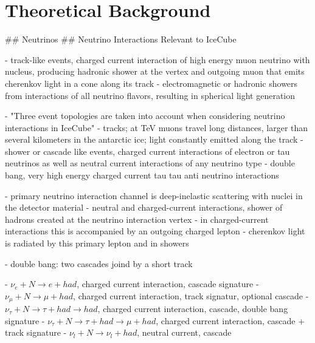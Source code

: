 
\section{Theoretical Background}
\label{sec:theoretical_background}

## Neutrinos
## Neutrino Interactions Relevant to IceCube

- track-like events, charged current interaction of high energy muon neutrino with nucleus, producing hadronic shower at the vertex and outgoing muon that emits cherenkov light in a cone along its track \cite{instrumentation}
- electromagnetic or hadronic showers from interactions of all neutrino flavors, resulting in spherical light generation \cite{instrumentation}

- "Three event topologies are taken into account when considering neutrino interactions in IceCube" \cite{skysearch}
  - tracks; at TeV muons travel long distances, larger than several kilometers in the antarctic ice; light constantly emitted along the track \cite{skysearch,mmc}
  - shower or cascade like events, charged current interactions of electron or tau neutrinos as well as neutral current interactions of any neutrino type \cite{skysearch}
  - double bang, very high energy charged current tau tau anti neutrino interactions \cite{skysearch}

- primary neutrino interaction channel is deep-inelastic scattering with nuclei in the detector material \cite{energyreco}
- neutral and charged-current interactions, shower of hadrons created at the neutrino interaction vertex \cite{energyreco}
- in charged-current interactions this is accompanied by an outgoing charged lepton \cite{energyreco}
- cherenkov light is radiated by this primary lepton and in showers \cite{energyreco}

- double bang: two cascades joind by a short track \cite{energyreco}

- $\nu_e + N \rightarrow e + had$, charged current interaction, cascade signature \cite{energyreco}
- $\nu_\mu + N \rightarrow \mu + had$, charged current interaction, track signatur, optional cascade \cite{energyreco}
- $\nu_\tau + N \rightarrow \tau + had \rightarrow had$, charged current interaction, cascade, double bang signature \cite{energyreco}
- $\nu_\tau + N \rightarrow \tau + had \rightarrow \mu + had$, charged current interaction, cascade + track signature \cite{energyreco}
- $\nu_l + N \rightarrow \nu_l + had$, neutral current, cascade \cite{energyreco}

